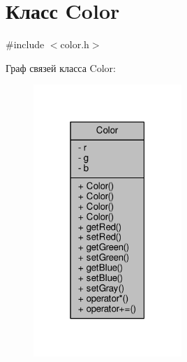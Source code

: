 \hypertarget{class_color}{}\section{Класс Color}
\label{class_color}


{\ttfamily \#include $<$color.\+h$>$}



Граф связей класса Color\+:
\nopagebreak
\begin{figure}[H]
\begin{center}
\leavevmode
\includegraphics[width=159pt]{d2/d71/class_color__coll__graph}
\end{center}
\end{figure}
